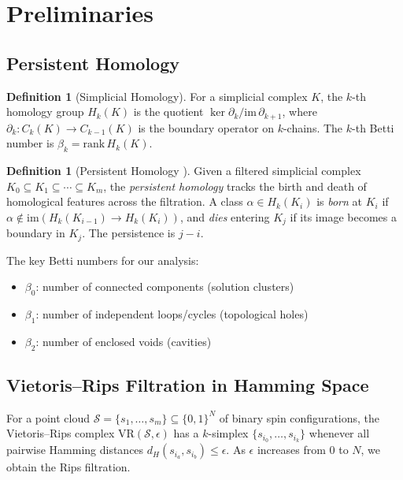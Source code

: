 \documentclass[12pt,a4paper]{article}
\theoremstyle{definition}\newtheorem{definition}[theorem]{Definition}
\theoremstyle{remark}\newtheorem{remark}[theorem]{Remark}
\newcommand{\betaone}{\beta_1}
\newcommand{\betazero}{\beta_0}
\begin{document}
\section{Preliminaries}
\label{sec:prelim}

\subsection{Persistent Homology}

\begin{definition}[Simplicial Homology]
\label{def:homology}
For a simplicial complex $K$, the $k$-th homology group $H_k(K)$ is the
quotient $\ker \partial_k / \mathrm{im}\,\partial_{k+1}$, where
$\partial_k: C_k(K) \to C_{k-1}(K)$ is the boundary operator on $k$-chains.
The $k$-th Betti number is $\beta_k = \mathrm{rank}\,H_k(K)$.
\end{definition}

\begin{definition}[Persistent Homology \cite{edelsbrunner2010}]
\label{def:ph}
Given a filtered simplicial complex $K_0 \subseteq K_1 \subseteq \cdots
\subseteq K_m$, the \emph{persistent homology} tracks the birth and death
of homological features across the filtration. A class $\alpha \in H_k(K_i)$
is \emph{born} at $K_i$ if $\alpha \notin \mathrm{im}(H_k(K_{i-1}) \to
H_k(K_i))$, and \emph{dies} entering $K_j$ if its image becomes a boundary
in $K_j$. The persistence is $j - i$.
\end{definition}

The key Betti numbers for our analysis:
\begin{itemize}
  \item $\betazero$: number of connected components (solution clusters)
  \item $\betaone$: number of independent loops/cycles (topological holes)
  \item $\beta_2$: number of enclosed voids (cavities)
\end{itemize}

\subsection{Vietoris--Rips Filtration in Hamming Space}

For a point cloud $\mathcal{S} = \{s_1, \ldots, s_m\} \subseteq \{0,1\}^N$
of binary spin configurations, the Vietoris--Rips complex $\mathrm{VR}(\mathcal{S}, \epsilon)$
has a $k$-simplex $\{s_{i_0}, \ldots, s_{i_k}\}$ whenever all pairwise
Hamming distances $d_H(s_{i_a}, s_{i_b}) \leq \epsilon$. As $\epsilon$
increases from 0 to $N$, we obtain the Rips filtration.
\end{document}
